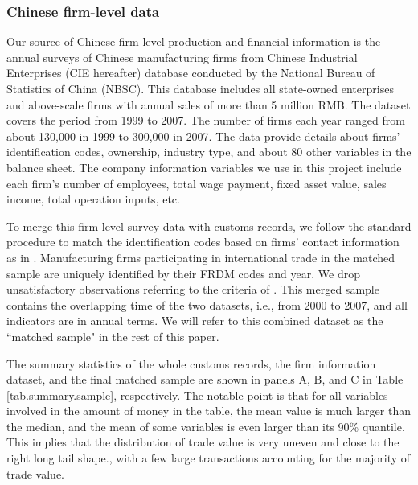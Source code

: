 \documentclass[12pt]{article}
\begin{document}
\subsubsection{Chinese firm-level data} \label{Data-CIE}

Our source of Chinese firm-level production and financial information is the annual surveys of Chinese manufacturing firms from Chinese Industrial Enterprises (CIE hereafter) database conducted by the National Bureau of Statistics of China (NBSC). This database includes all state-owned enterprises and above-scale firms with annual sales of more than 5 million RMB. The dataset covers the period from 1999 to 2007. The number of firms each year ranged from about 130,000 in 1999 to 300,000 in 2007. The data provide details about firms’ identification codes, ownership, industry type, and about 80 other variables in the balance sheet. The company information variables we use in this project include each firm's number of employees, total wage payment, fixed asset value, sales income, total operation inputs, etc.

To merge this firm-level survey data with customs records, we follow the standard procedure to match the identification codes based on firms' contact information as in \cite{fan-li-yeaple2015}. Manufacturing firms participating in international trade in the matched sample are uniquely identified by their FRDM codes and year. We drop unsatisfactory observations referring to the criteria of \cite{bkl2021}. This merged sample contains the overlapping time of the two datasets, i.e., from 2000 to 2007, and all indicators are in annual terms. We will refer to this combined dataset as the ``matched sample" in the rest of this paper.

The summary statistics of the whole customs records, the firm information dataset, and the final matched sample are shown in panels A, B, and C in Table \ref{tab.summary.sample}, respectively. The notable point is that for all variables involved in the amount of money in the table, the mean value is much larger than the median, and the mean of some variables is even larger than its 90\% quantile. This implies that the distribution of trade value is very uneven and close to the right long tail shape., with a few large transactions accounting for the majority of trade value.
\end{document}
